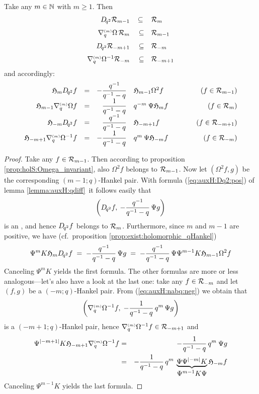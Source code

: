 \begin{prop} \label{prop:holqHankel:qdiff}
Take any\/ $m\in \mathbb{N}$ with\/ $m\geq 1$. Then
$$\begin{array}{rcl}
   \Dqsqr \holS{m-1}  &\subseteq&   \holS{m}
\\
   \nabq{m} \Omega \, \holS{m}     &\vertXL\subseteq&   \holS{m-1}
\\
   \Dqsqr \holS{-m+1}             &\vertXL\subseteq&   \holS{-m}
\\
  \nabq{m} \Omega^{-1}  \holS{-m}  &\vertXL\subseteq&   \holS{-m+1}
\end{array}$$
and accordingly:
$$\begin{array}{rcrlcr}
    \mathfrak{H}_{m} D_{\!q^2} f
    &=&
    \displaystyle -\frac{q^{-1}}{q^{-1}-q}  & \mathfrak{H}_{m-1} \Omega^2 f
    &\hspace{2em}&
    (f\in {\mathcal R}_{m-1})
\\
    \mathfrak{H}_{m-1} \nabla_q^{\scriptscriptstyle (m)} \Omega f
    &=&
    \displaystyle \frac{1}{q^{-1}-q} &   q^{-m}\: \Psi \mathfrak{H}_{m}f
    &&
    (f\in {\mathcal R}_{m})
\\
    \mathfrak{H}_{-m} D_{\!q^2} f
    &=&
    \displaystyle  \frac{q^{-1}}{q^{-1}-q} &   \mathfrak{H}_{-m+1}f
    &&
    (f\in {\mathcal R}_{-m+1})
\\
    \mathfrak{H}_{-m+1} \nabla_q^{\scriptscriptstyle (m)} \Omega^{-1}f
    &=&
    \displaystyle -\frac{1}{q^{-1}-q} &   q^m\: \Psi \mathfrak{H}_{-m} f
    &&
    (f\in {\mathcal R}_{-m})
\end{array}$$
\end{prop}
\vspace{2ex}

\begin{proof}
Take any $f\in {\mathcal R}_{m-1}$. Then according to proposition \ref{prop:holS:Omega_invariant},
also $\Omega^2 f$ belongs to ${\mathcal R}_{m-1}$.
Now let $(\Omega^2 f,g)$ be the corresponding \mbox{$(m-1;q)$-Hankel} pair.
With formula (\ref{eq:auxH:Dq2:pos}) of lemma \ref{lemma:auxH:qdiff}\ it follows easily that
$$ \left(D_{\!q^2} f,  \:  - \frac{q^{-1}}{q^{-1}-q} \,\Psi g \right) $$
is an \Hmpair, and hence $D_{\!q^2} f$ belongs to ${\mathcal R}_{m}$.
Furthermore, since $m$ and $m-1$ are positive, we have
(cf.\ proposition \ref{prop:exist:holomorphic_qHankel})
$$ \Psi^m K \mathfrak{H}_{m} D_{\!q^2} f
    \;=\;  -\frac{q^{-1}}{q^{-1}-q}\, \Psi g
    \;=\;  -\frac{q^{-1}}{q^{-1}-q}\, \Psi \Psi^{m-1} K \mathfrak{H}_{m-1} \Omega^2 f $$
Canceling $\Psi^m K$ yields the first formula. The other formulas
are more or less analogous---let's also have a look at the last one:
take any $f\in {\mathcal R}_{-m}$ and let $(f,g)$ be a \mbox{$(-m;q)$-Hankel} pair.
From (\ref{eq:auxH:nabq:neg}) we obtain that
$$ \left(\nabla_q^{\scriptscriptstyle (m)} \Omega^{-1}f, \; -\frac{1}{q^{-1}-q} \, q^m\, \Psi g \right)$$
is a \mbox{$(-m+1;q)$-Hankel} pair, hence $\nabla_q^{\scriptscriptstyle (m)} \Omega^{-1}f \in {\mathcal R}_{-m+1}$ and
\begin{eqnarray*}
    \Psi^{|-m+1|} K \mathfrak{H}_{-m+1} \nabla_q^{\scriptscriptstyle (m)} \Omega^{-1} f
&=&
    -\frac{1}{q^{-1}-q} \, q^m\: \Psi g
\\&=&
    -\frac{1}{q^{-1}-q} \, q^m\:
     \underbrace{\Psi \Psi^{|-m|} K}_{\textstyle \Psi^{m-1} K \Psi} \mathfrak{H}_{-m} f
\end{eqnarray*}
Canceling $\Psi^{m-1} K$ yields the last formula.
\end{proof}



